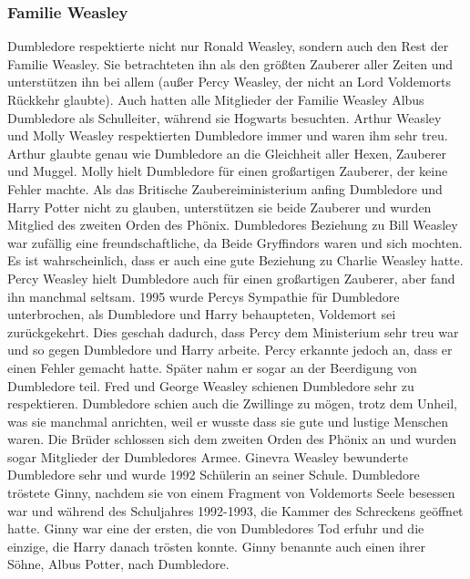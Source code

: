 \documentclass[a4paper, 10pt]{article}
\begin{document}
\subsubsection*{\large Familie Weasley}
Dumbledore respektierte nicht nur Ronald Weasley, sondern auch den Rest der Familie Weasley. Sie betrachteten ihn als den größten Zauberer aller Zeiten und unterstützen ihn bei allem (außer Percy Weasley, der nicht an Lord Voldemorts Rückkehr glaubte). Auch hatten alle Mitglieder der Familie Weasley Albus Dumbledore als Schulleiter, während sie Hogwarts besuchten.
\vspace{10pt}
\newline
Arthur Weasley und Molly Weasley respektierten Dumbledore immer und waren ihm sehr treu. Arthur glaubte genau wie Dumbledore an die Gleichheit aller Hexen, Zauberer und Muggel. Molly hielt Dumbledore für einen großartigen Zauberer, der keine Fehler machte. Als das Britische Zaubereiministerium anfing Dumbledore und Harry Potter nicht zu glauben, unterstützen sie beide Zauberer und wurden Mitglied des zweiten Orden des Phönix.
\vspace{10pt}
\newline
Dumbledores Beziehung zu Bill Weasley war zufällig eine freundschaftliche, da Beide Gryffindors waren und sich mochten. Es ist wahrscheinlich, dass er auch eine gute Beziehung zu Charlie Weasley hatte.
\vspace{10pt}
\newline
Percy Weasley hielt Dumbledore auch für einen großartigen Zauberer, aber fand ihn manchmal seltsam. 1995 wurde Percys Sympathie für Dumbledore unterbrochen, als Dumbledore und Harry behaupteten, Voldemort sei zurückgekehrt. Dies geschah dadurch, dass Percy dem Ministerium sehr treu war und so gegen Dumbledore und Harry arbeite. Percy erkannte jedoch an, dass er einen Fehler gemacht hatte. Später nahm er sogar an der Beerdigung von Dumbledore teil.
\vspace{10pt}
\newline
Fred und George Weasley schienen Dumbledore sehr zu respektieren. Dumbledore schien auch die Zwillinge zu mögen, trotz dem Unheil, was sie manchmal anrichten, weil er wusste dass sie gute und lustige Menschen waren. Die Brüder schlossen sich dem zweiten Orden des Phönix an und wurden sogar Mitglieder der Dumbledores Armee.
\vspace{10pt}
\newline
Ginevra Weasley bewunderte Dumbledore sehr und wurde 1992 Schülerin an seiner Schule. Dumbledore tröstete Ginny, nachdem sie von einem Fragment von Voldemorts Seele besessen war und während des Schuljahres 1992-1993, die Kammer des Schreckens geöffnet hatte. Ginny war eine der ersten, die von Dumbledores Tod erfuhr und die einzige, die Harry danach trösten konnte. Ginny benannte auch einen ihrer Söhne, Albus Potter, nach Dumbledore.
\end{document}
